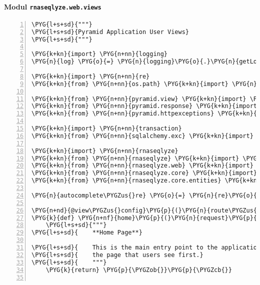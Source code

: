 \paragraph{Modul \texttt{rnaseqlyze.web.views}}
\label{rnaseqlyze-pdf:modul-rnaseqlyze-web-views}
\begin{Verbatim}[commandchars=\\\{\},numbers=left,firstnumber=1,stepnumber=5]
\PYG{l+s+sd}{"""}
\PYG{l+s+sd}{Pyramid Application User Views}
\PYG{l+s+sd}{"""}

\PYG{k+kn}{import} \PYG{n+nn}{logging}
\PYG{n}{log} \PYG{o}{=} \PYG{n}{logging}\PYG{o}{.}\PYG{n}{getLogger}\PYG{p}{(}\PYG{n}{\PYGZus{}\PYGZus{}name\PYGZus{}\PYGZus{}}\PYG{p}{)}

\PYG{k+kn}{import} \PYG{n+nn}{re}
\PYG{k+kn}{from} \PYG{n+nn}{os.path} \PYG{k+kn}{import} \PYG{n}{join}

\PYG{k+kn}{from} \PYG{n+nn}{pyramid.view} \PYG{k+kn}{import} \PYG{n}{view\PYGZus{}config}
\PYG{k+kn}{from} \PYG{n+nn}{pyramid.response} \PYG{k+kn}{import} \PYG{n}{FileResponse}
\PYG{k+kn}{from} \PYG{n+nn}{pyramid.httpexceptions} \PYG{k+kn}{import} \PYG{n}{HTTPFound}

\PYG{k+kn}{import} \PYG{n+nn}{transaction}
\PYG{k+kn}{from} \PYG{n+nn}{sqlalchemy.exc} \PYG{k+kn}{import} \PYG{n}{DBAPIError}

\PYG{k+kn}{import} \PYG{n+nn}{rnaseqlyze}
\PYG{k+kn}{from} \PYG{n+nn}{rnaseqlyze} \PYG{k+kn}{import} \PYG{n}{galaxy}
\PYG{k+kn}{from} \PYG{n+nn}{rnaseqlyze.web} \PYG{k+kn}{import} \PYG{n}{DBSession}\PYG{p}{,} \PYG{n}{DBSession\PYGZus{}unmanaged}
\PYG{k+kn}{from} \PYG{n+nn}{rnaseqlyze.core} \PYG{k+kn}{import} \PYG{n}{service}
\PYG{k+kn}{from} \PYG{n+nn}{rnaseqlyze.core.entities} \PYG{k+kn}{import} \PYG{n}{Analysis}\PYG{p}{,} \PYG{n}{UCSCOrganism}

\PYG{n}{autocomplete\PYGZus{}re} \PYG{o}{=} \PYG{n}{re}\PYG{o}{.}\PYG{n}{compile}\PYG{p}{(}\PYG{l+s}{r"}\PYG{l+s}{\PYGZca{}[\PYGZca{}(]+}\PYG{l+s}{\PYGZbs{}}\PYG{l+s}{([\PYGZca{}/]+/([\PYGZca{})]+)}\PYG{l+s}{\PYGZbs{}}\PYG{l+s}{).*\PYGZdl{}}\PYG{l+s}{"}\PYG{p}{)}

\PYG{n+nd}{@view\PYGZus{}config}\PYG{p}{(}\PYG{n}{route\PYGZus{}name}\PYG{o}{=}\PYG{l+s}{'}\PYG{l+s}{home}\PYG{l+s}{'}\PYG{p}{,} \PYG{n}{renderer}\PYG{o}{=}\PYG{l+s}{'}\PYG{l+s}{templates/home.pt}\PYG{l+s}{'}\PYG{p}{)}
\PYG{k}{def} \PYG{n+nf}{home}\PYG{p}{(}\PYG{n}{request}\PYG{p}{)}\PYG{p}{:}
    \PYG{l+s+sd}{"""}
\PYG{l+s+sd}{    **Home Page**}

\PYG{l+s+sd}{    This is the main entry point to the application. I.e. the landing page,}
\PYG{l+s+sd}{    the page that users see first.}
\PYG{l+s+sd}{    """}
    \PYG{k}{return} \PYG{p}{\PYGZob{}}\PYG{p}{\PYGZcb{}}


\end{Verbatim}
